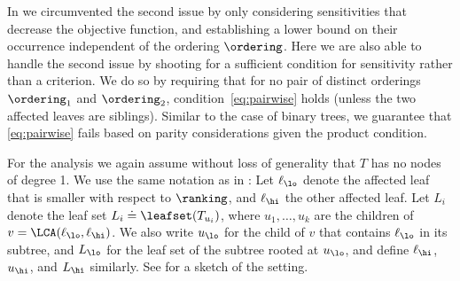 \documentclass{toc}
\begin{document}
In  we circumvented the second issue by only considering sensitivities that decrease the objective function, and establishing a lower bound on their occurrence independent of the ordering $\ordering$. Here we are also able to handle the second issue by shooting for a sufficient condition for sensitivity rather than a criterion. We do so by requiring that for no pair of distinct orderings $\ordering_1$ and $\ordering_2$, condition~\eqref{eq:pairwise} holds (unless the two affected leaves are siblings). Similar to the case of binary trees, we guarantee that \eqref{eq:pairwise} fails based on parity considerations given the product condition. 

For the analysis we again assume without loss of generality that $T$ has no nodes of degree 1. We use the same notation as in : Let  $\ell_\lo$ denote the affected leaf that is smaller with respect to $\ranking$, and $\ell_\hi$ the other affected leaf. Let $L_i$ denote the leaf set $L_i \doteq \leafset(T_{u_i})$, where $u_1, \dots, u_k$ are the children of $v = \LCA(\ell_\lo,\ell_\hi)$. We also write $u_\lo$ for the child of $v$ that contains $\ell_\lo$ in its subtree, and $L_\lo$ for the leaf set of the subtree rooted at $u_\lo$, and define $\ell_\hi$, $u_\hi$, and $L_\hi$ similarly. See  for a sketch of the setting.
\end{document}
